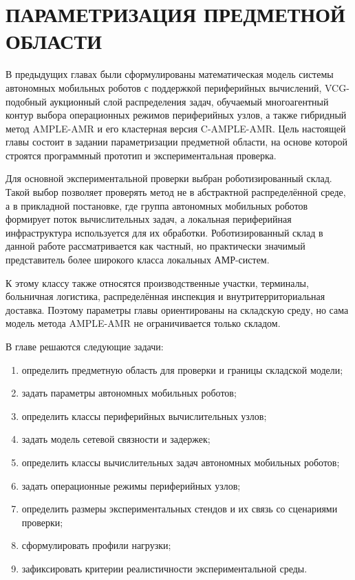 \chapter{ПАРАМЕТРИЗАЦИЯ ПРЕДМЕТНОЙ ОБЛАСТИ}\label{ch:ch6}

В предыдущих главах были сформулированы математическая модель системы автономных мобильных роботов с поддержкой периферийных вычислений, VCG-подобный аукционный слой распределения задач, обучаемый многоагентный контур выбора операционных режимов периферийных узлов, а также гибридный метод AMPLE-AMR и его кластерная версия C-AMPLE-AMR. Цель настоящей главы состоит в задании параметризации предметной области, на основе которой строятся программный прототип и экспериментальная проверка.

Для основной экспериментальной проверки выбран роботизированный склад. Такой выбор позволяет проверять метод не в абстрактной распределённой среде, а в прикладной постановке, где группа автономных мобильных роботов формирует поток вычислительных задач, а локальная периферийная инфраструктура используется для их обработки. Роботизированный склад в данной работе рассматривается как частный, но практически значимый представитель более широкого класса локальных АМР-систем.

К этому классу также относятся производственные участки, терминалы, больничная логистика, распределённая инспекция и внутритерриториальная доставка. Поэтому параметры главы ориентированы на складскую среду, но сама модель метода AMPLE-AMR не ограничивается только складом.

В главе решаются следующие задачи:
\begin{enumerate}
	\item определить предметную область для проверки и границы складской модели;
	\item задать параметры автономных мобильных роботов;
	\item определить классы периферийных вычислительных узлов;
	\item задать модель сетевой связности и задержек;
	\item определить классы вычислительных задач автономных мобильных роботов;
	\item задать операционные режимы периферийных узлов;
	\item определить размеры экспериментальных стендов и их связь со сценариями проверки;
	\item сформулировать профили нагрузки;
	\item зафиксировать критерии реалистичности экспериментальной среды.
\end{enumerate}

